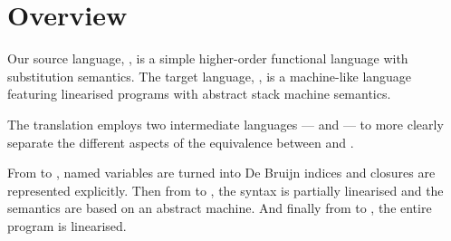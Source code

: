 

\section{Overview}
Our source language, \hlang, is a simple higher-order functional language with substitution semantics.
The target language, \mlang, is a machine-like language featuring linearised programs with abstract stack machine semantics.

The translation employs two intermediate languages --- \blang and \slang --- to more clearly separate the different aspects of the equivalence between \hlang and \mlang.

From \hlang to \blang, named variables are turned into De Bruijn indices and closures are represented explicitly.
Then from \blang to \slang, the syntax is partially linearised and the semantics are based on an abstract machine.
And finally from \slang to \mlang, the entire program is linearised.

